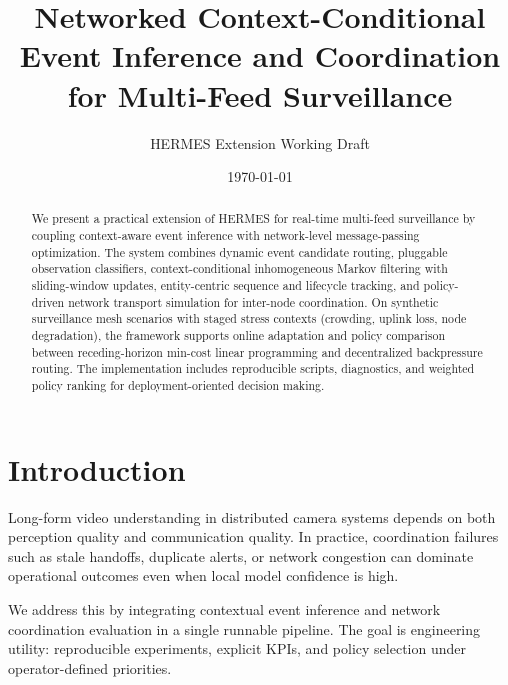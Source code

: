 \documentclass[11pt]{article}
\title{Networked Context-Conditional Event Inference and Coordination for Multi-Feed Surveillance}
\author{HERMES Extension Working Draft}
\date{\today}
\begin{document}
\maketitle

\begin{abstract}
We present a practical extension of HERMES for real-time multi-feed surveillance by coupling context-aware event inference with network-level message-passing optimization. The system combines dynamic event candidate routing, pluggable observation classifiers, context-conditional inhomogeneous Markov filtering with sliding-window updates, entity-centric sequence and lifecycle tracking, and policy-driven network transport simulation for inter-node coordination. On synthetic surveillance mesh scenarios with staged stress contexts (crowding, uplink loss, node degradation), the framework supports online adaptation and policy comparison between receding-horizon min-cost linear programming and decentralized backpressure routing. The implementation includes reproducible scripts, diagnostics, and weighted policy ranking for deployment-oriented decision making.
\end{abstract}

\section{Introduction}
Long-form video understanding in distributed camera systems depends on both perception quality and communication quality. In practice, coordination failures such as stale handoffs, duplicate alerts, or network congestion can dominate operational outcomes even when local model confidence is high.

We address this by integrating contextual event inference and network coordination evaluation in a single runnable pipeline. The goal is engineering utility: reproducible experiments, explicit KPIs, and policy selection under operator-defined priorities.
\end{document}
